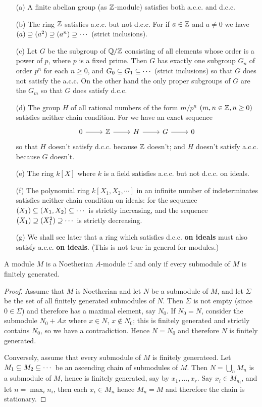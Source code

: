 \begin{example}
\mbox{}
\begin{itemize}
\item[(a)] A finite abelian group (as $\mathbb{Z}$-module) satisfies both a.c.c. and d.c.c.
\item[(b)] The ring $\mathbb{Z}$ satisfies a.c.c. but not d.c.c. For if $a\in\mathbb{Z}$ and
$a\neq 0$ we have $(a)\supseteq (a^2)\supseteq(a^n)\supseteq\cdots$ (strict inclusions).
\item[(c)] Let $G$ be the subgroup of $\mathbb{Q}/\mathbb{Z}$ consisting of all elements whose order is a power of $p$, where $p$ is a fixed prime. Then $G$ has exactly one subgroup $G_n$ of order $p^n$ for each $n\geq 0$, and $G_0\subseteq G_1\subseteq\cdots$ (strict inclusions) so that $G$ does not satisfy the a.c.c. On the other hand the only proper subgroups of $G$ are the $G_m$ so that $G$ does satisfy d.c.c.
\item[(d)] The group $H$ of all rational numbers of the form $m/p^n$ $(m,n\in\mathbb{Z}, n\geq 0)$ satisfies neither chain condition. For we have an exact sequence 
\[\begin{tikzcd}
0\ar[r]&\Z\ar[r]&H\ar[r]&G\ar[r]&0
\end{tikzcd}\]
so that $H$ doesn't satisfy d.c.c. because $\mathbb{Z}$ doesn't; and $H$ doesn't satisfy a.c.c. because $G$ doesn't.
\item[(e)] The ring $k[X]$ where $k$ is a field satisfies a.c.c. but not d.c.c. on ideals.
\item[(f)] The polynomial ring $k[X_1,X_2,\cdots]$ in an infinite number of indeterminates satisfies neither chain condition on ideals: for the sequence $(X_1)\subseteq(X_1,X_2)\subseteq\cdots$ is strictly increasing, and the sequence $(X_1)\supseteq(X_1^2)\supseteq\cdots$ is strictly decreasing.
\item[(g)] We shall see later that a ring which satisfies d.c.c. \textbf{on ideals} must also satisfy a.c.c. \textbf{on ideals}. (This is not true in general for modules.)
\end{itemize}
\end{example}
\begin{proposition}\label{Noe module iff submodule Noe}
A module $M$ is a Noetherian $A$-module if and only if every submodule of $M$ is finitely generated.
\end{proposition}
\begin{proof}
Assume that $M$ is Noetherian and let $N$ be a submodule of $M$, and let $\Sigma$ be the set of all finitely generated submodules of $N$. Then $\Sigma$ is not empty (since $0\in\Sigma$) and therefore has a maximal element, say $N_0$. If $N_0=N$, consider the submodule $N_0+Ax$ where $x\in N$, $x\notin N_0$; this is finitely generated and strictly contains $N_0$, so we have a contradiction. Hence $N=N_0$ and therefore $N$ is finitely generated.\par
Conversely, assume that every submodule of $M$ is finitely generateed. Let $M_1\subseteq M_2\subseteq\cdots$ be an ascending chain of submodules of $M$. Then $N=\bigcup_nM_n$ is a submodule of $M$, hence is finitely generated, say by $x_1,\dots,x_r$. Say $x_i\in M_{n_i}$, and let $n=\max_{i}n_i$, then each $x_i\in M_n$ hence $M_n=M$ and therefore the chain is stationary.
\end{proof}
